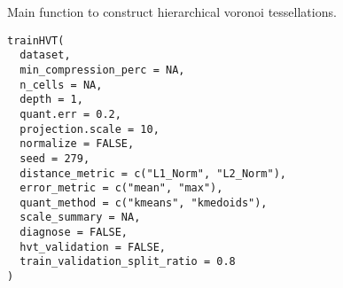 \usepackage[utf8]{inputenc}
%
\begin{Description}
Main function to construct hierarchical voronoi tessellations.
\end{Description}
%
\begin{Usage}
\begin{verbatim}
trainHVT(
  dataset,
  min_compression_perc = NA,
  n_cells = NA,
  depth = 1,
  quant.err = 0.2,
  projection.scale = 10,
  normalize = FALSE,
  seed = 279,
  distance_metric = c("L1_Norm", "L2_Norm"),
  error_metric = c("mean", "max"),
  quant_method = c("kmeans", "kmedoids"),
  scale_summary = NA,
  diagnose = FALSE,
  hvt_validation = FALSE,
  train_validation_split_ratio = 0.8
)
\end{verbatim}
\end{Usage}
%
